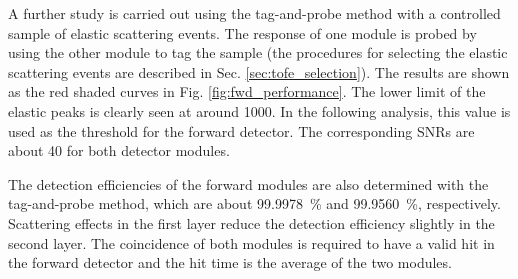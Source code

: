 \documentclass[number,5p]{elsarticle}
\begin{document}
A further study is carried out using the tag-and-probe method with a controlled
sample of elastic scattering events.
The response of one module is probed by using the other module to tag the sample
(the procedures for selecting the elastic scattering events are described in Sec. \ref{sec:tofe_selection}).
The results are shown as the red shaded curves in Fig. \ref{fig:fwd_performance}.
The lower limit of the elastic peaks is clearly seen at around \num{1000}.
In the following analysis, this value is used as the threshold for the forward detector.
The corresponding SNRs are about \num{40} for both detector modules.

The detection efficiencies of the forward modules are also determined with the
tag-and-probe method, which are about \SI{99.9978}{\percent} and \SI{99.9560}{\percent}, respectively.
Scattering effects in the first layer reduce the detection efficiency slightly in the second layer.
The coincidence of both modules is required to have a valid hit in the
forward detector and the hit time is the average of the two modules.

\end{document}
